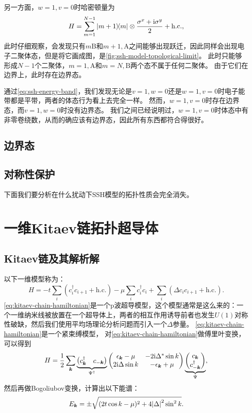 另一方面，$w = 1, v = 0$时哈密顿量为
\begin{equation}
    H = \sum_{m=1}^{N-1} \dyad{m+1}{m} \otimes \frac{\sigma^x + \ii \sigma^y}{2} + \text{h.c.},
\end{equation}
此时仔细观察，会发现只有$m \text{B}$和$m+1, \text{A}$之间能够出现跃迁，因此同样会出现电子二聚体态，但是将它画成图，是\autoref{fig:ssh-model-topological-limit}。
此时只能够形成$N-1$个二聚体，$m=1, \text{A}$和$m=N, \text{B}$两个态不属于任何二聚体。
由于它们在边界上，此时存在边界态。

通过\eqref{eq:ssh-energy-band}，我们发现无论是$v=1, w=0$还是$w=1,v=0$时电子能带都是平带，两者的体态行为看上去完全一样。
然而，$w=1, v=0$时存在边界态，而$v=1, w=0$时没有边界态。
我们之间已经说明过，$w=1, v=0$时体态中有非零卷绕数，从而的确应该有边界态，因此所有东西都符合得很好。

\subsection{边界态}

\subsection{对称性保护}

下面我们要分析在什么扰动下SSH模型的拓扑性质会完全消失。

\section{一维Kitaev链拓扑超导体}

\subsection{Kitaev链及其解析解}

以下一维模型称为：
\begin{equation}
    {H} = - t \sum_{i} ({c}_{i}^\dagger {c}_{i+1} + \text{h.c.}) - \mu \sum_{i} {c}_{i}^\dagger {c}_{i} + \sum_{i} (\Delta {c}_{i} {c}_{i+1} + \text{h.c.} ).
    \label{eq:kitaev-chain-hamiltonian}
\end{equation}
\eqref{eq:kitaev-chain-hamiltonian}是一个p波超导模型，这个模型通常是这么来的：一个一维纳米线被放置在一个超导体上，两者的相互作用诱导前者也发生$U(1)$对称性破缺，然后我们使用平均场理论分析问题而引入一个$\Delta$参量。
\eqref{eq:kitaev-chain-hamiltonian}是一个紧束缚模型，
对\eqref{eq:kitaev-chain-hamiltonian}做傅里叶变换，可以得到
\begin{equation}
    {H} = \frac{1}{2} \sum_{\vb*{k}} \underbrace{\pmqty{{c}^\dagger_{\vb*{k}} & {c}_{-\vb*{k}}}}_{{\Psi}^\dagger} \pmqty{\epsilon_{\vb*{k}} - \mu & -2 \ii \Delta^* \sin k \\ 2 \ii \Delta \sin k & - \epsilon_{\vb*{k}} + \mu} \underbrace{\pmqty{{c}_{\vb*{k}} \\ {c}^\dagger_{-\vb*{k}}}}_{{\Psi}},
\end{equation}
然后再做Bogoliubov变换，计算出以下能谱：
\begin{equation}
    E_{\vb*{k}} = \pm \sqrt{(2t \cos k - \mu)^2 + 4 \abs{\Delta}^2 \sin^2 k}.
\end{equation}

